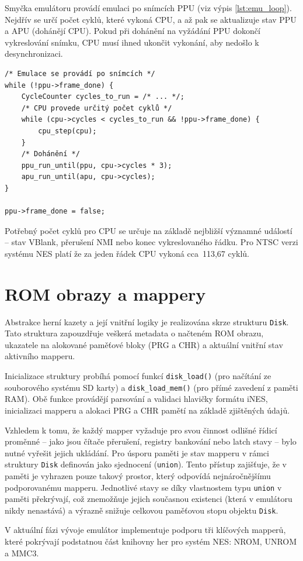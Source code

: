 Smyčka emulátoru provádí emulaci po snímcích PPU (viz výpis \ref{lst:emu_loop}). Nejdřív se určí
počet cyklů, které vykoná CPU, a až pak se aktualizuje stav PPU a APU (dohánějí CPU). Pokud při
dohánění na vyžádání PPU dokončí vykreslování snímku, CPU musí ihned ukončit vykonání, aby nedošlo k
desynchronizaci.

\begin{listing}[htbp]
\begin{verbatim}
/* Emulace se provádí po snímcích */
while (!ppu->frame_done) {
    CycleCounter cycles_to_run = /* ... */;
    /* CPU provede určitý počet cyklů */
    while (cpu->cycles < cycles_to_run && !ppu->frame_done) {
        cpu_step(cpu);
    }
    /* Dohánění */
    ppu_run_until(ppu, cpu->cycles * 3);
    apu_run_until(apu, cpu->cycles);
}

ppu->frame_done = false;
\end{verbatim}
\caption{Smyčka emulátoru. CPU provádí určitý počet instrukcí, a pak PPU a APU dohánějí jeho stav.}
\label{lst:emu_loop}
\end{listing}

Potřebný počet cyklů pro CPU se určuje na základě nejbližší významné událostí -- stav VBlank,
přerušení NMI nebo konec vykreslovaného řádku. Pro NTSC verzi systému NES platí že za jeden řádek
CPU vykoná cca~113,67 cyklů.

\section{ROM obrazy a mappery}

Abstrakce herní kazety a její vnitřní logiky je realizována skrze strukturu \texttt{Disk}. Tato
struktura zapouzdřuje veškerá metadata o načteném ROM obrazu, ukazatele na alokované paměťové bloky
(PRG a CHR) a aktuální vnitřní stav aktivního mapperu.

Inicializace struktury probíhá pomocí funkcí \texttt{disk\_load()} (pro načítání ze souborového
systému SD karty) a \texttt{disk\_load\_mem()} (pro přímé zavedení z paměti RAM). Obě funkce
provádějí parsování a validaci hlavičky formátu iNES, inicializaci mapperu a alokaci PRG a CHR
pamětí na základě zjištěných údajů.

Vzhledem k tomu, že každý mapper vyžaduje pro svou činnost odlišné řídicí proměnné -- jako jsou
čítače přerušení, registry bankování nebo latch stavy -- bylo nutné vyřešit jejich ukládání. Pro
úsporu paměti je stav mapperu v rámci struktury \texttt{Disk} definován jako sjednocení
(\texttt{union}). Tento přístup zajišťuje, že v paměti je vyhrazen pouze takový prostor, který
odpovídá nejnáročnějšímu podporovanému mapperu. Jednotlivé stavy se díky vlastnostem typu
\texttt{union} v paměti překrývají, což znemožňuje jejich současnou existenci (která v emulátoru
nikdy nenastává) a výrazně snižuje celkovou paměťovou stopu objektu \texttt{Disk}.

V aktuální fázi vývoje emulátor implementuje podporu tři klíčových mapperů, které pokrývají
podstatnou část knihovny her pro systém NES: NROM, UNROM a MMC3.
